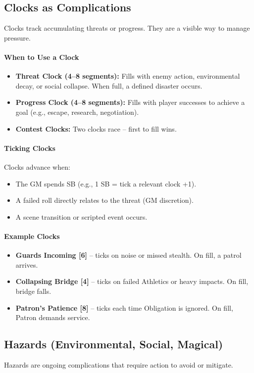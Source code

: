\subsection{Clocks as Complications}
Clocks track accumulating threats or progress. They are a visible way to manage pressure.

\paragraph{When to Use a Clock}
\begin{itemize}
  \item \textbf{Threat Clock (4--8 segments):} Fills with enemy action, environmental decay, or social collapse. When full, a defined disaster occurs.
  \item \textbf{Progress Clock (4--8 segments):} Fills with player successes to achieve a goal (e.g., escape, research, negotiation).
  \item \textbf{Contest Clocks:} Two clocks race -- first to fill wins.
\end{itemize}

\paragraph{Ticking Clocks}
Clocks advance when:
\begin{itemize}
  \item The GM spends SB (e.g., 1 SB = tick a relevant clock +1).
  \item A failed roll directly relates to the threat (GM discretion).
  \item A scene transition or scripted event occurs.
\end{itemize}

\paragraph{Example Clocks}
\begin{itemize}
  \item \textbf{Guards Incoming [6]} -- ticks on noise or missed stealth. On fill, a patrol arrives.
  \item \textbf{Collapsing Bridge [4]} -- ticks on failed Athletics or heavy impacts. On fill, bridge falls.
  \item \textbf{Patron's Patience [8]} -- ticks each time Obligation is ignored. On fill, Patron demands service.
\end{itemize}

\subsection{Hazards (Environmental, Social, Magical)}
Hazards are ongoing complications that require action to avoid or mitigate.

